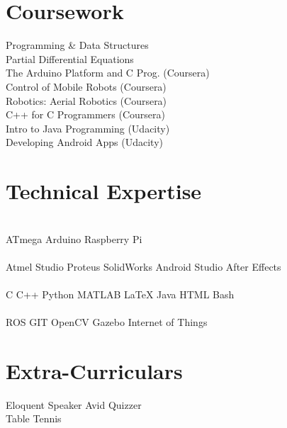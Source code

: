 \documentclass[letterpaper]{aman}
\begin{document}
\begin{minipage}[t]{0.39\textwidth}

\section{Coursework}
Programming \& Data Structures\\
Partial Differential Equations \\
The Arduino Platform and C Prog. (Coursera)\\
Control of Mobile Robots (Coursera)\\
Robotics: Aerial Robotics (Coursera)\\
C++ for C Programmers (Coursera) \\
Intro to Java Programming (Udacity)\\
Developing Android Apps (Udacity)\\
\sectionsep



\section{Technical Expertise}
\\
ATmega \textbullet{} Arduino \textbullet{} Raspberry Pi\\
{}\\
Atmel Studio \textbullet Proteus \textbullet SolidWorks \textbullet Android Studio \textbullet After Effects \\
{}\\
 C  \textbullet{} C++ \textbullet{} Python \textbullet{} MATLAB  \textbullet{} \LaTeX \textbullet{}  Java \textbullet{} HTML \textbullet Bash\\
{}\\
ROS \textbullet{} GIT \textbullet OpenCV \textbullet Gazebo \textbullet Internet of Things\\
\sectionsep



\section{Extra-Curriculars}  
Eloquent Speaker \textbullet{} Avid Quizzer \textbullet{}\\
Table Tennis 
\sectionsep


\end{minipage} 
\hfill
\end{document}
